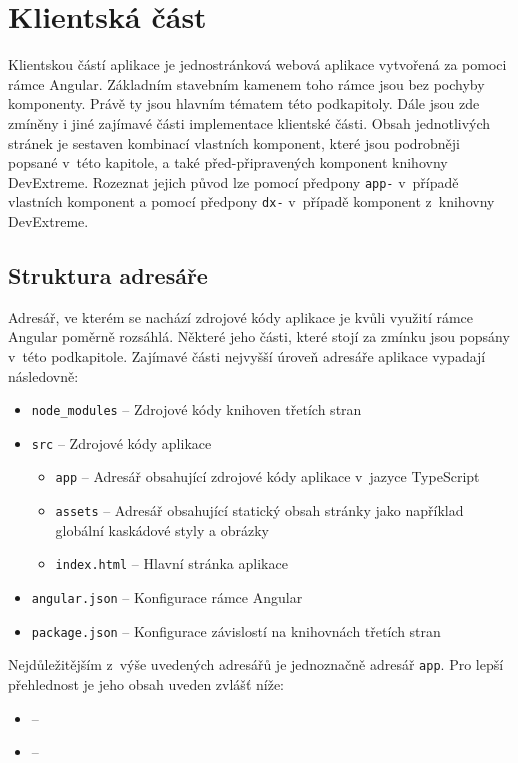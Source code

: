 \section{Klientská část}
Klientskou částí aplikace je jednostránková webová aplikace vytvořená za pomoci rámce Angular. Základním stavebním kamenem toho rámce jsou bez pochyby komponenty. Právě ty jsou hlavním tématem této podkapitoly. Dále jsou zde zmíněny i jiné zajímavé části implementace klientské části. Obsah jednotlivých stránek je sestaven kombinací vlastních komponent, které jsou podrobněji popsané v~této kapitole, a také před-připravených komponent knihovny DevExtreme. Rozeznat jejich původ lze pomocí předpony \texttt{app-} v~případě vlastních komponent a pomocí předpony \texttt{dx-} v~případě komponent z~knihovny DevExtreme.


\subsection{Struktura adresáře}
Adresář, ve kterém se nachází zdrojové kódy aplikace je kvůli využití rámce Angular poměrně rozsáhlá. Některé jeho části, které stojí za zmínku jsou popsány v~této podkapitole. Zajímavé části nejvyšší úroveň adresáře aplikace vypadají následovně:

\begin{itemize}
  \item \texttt{node\_modules} -- Zdrojové kódy knihoven třetích stran
  \item \texttt{src} -- Zdrojové kódy aplikace
  \begin{itemize}
    \item \texttt{app} -- Adresář obsahující zdrojové kódy aplikace v~jazyce TypeScript
     \item \texttt{assets} -- Adresář obsahující statický obsah stránky jako například globální kaskádové styly a obrázky
     \item \texttt{index.html} -- Hlavní stránka aplikace
  \end{itemize}
  \item \texttt{angular.json} -- Konfigurace rámce Angular
  \item \texttt{package.json} -- Konfigurace závislostí na knihovnách třetích stran
\end{itemize}

Nejdůležitějším z~výše uvedených adresářů je jednoznačně adresář \texttt{app}. Pro lepší přehlednost je jeho obsah uveden zvlášť níže:

\begin{itemize}
  \item \texttt{} -- 
  \item \texttt{} --
\end{itemize}


